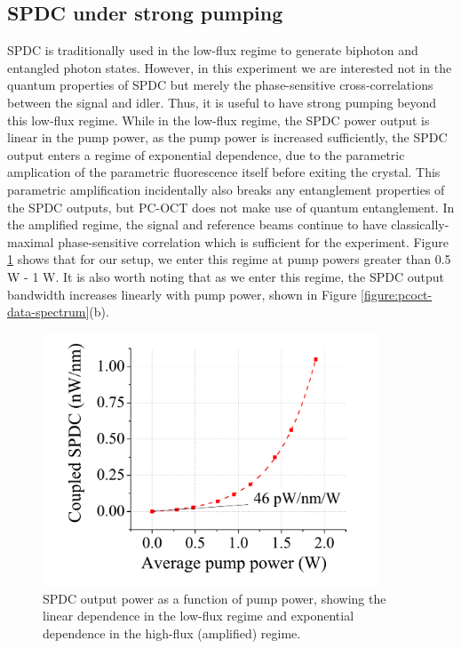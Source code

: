 \subsection{SPDC under strong pumping}

SPDC is traditionally used in the low-flux regime to generate biphoton and entangled photon states. However, in this experiment we are interested not in the quantum properties of SPDC but merely the phase-sensitive cross-correlations between the signal and idler. Thus, it is useful to have strong pumping beyond this low-flux regime. While in the low-flux regime, the SPDC power output is linear in the pump power, as the pump power is increased sufficiently, the SPDC output enters a regime of exponential dependence, due to the parametric amplication of the parametric fluorescence itself before exiting the crystal. This parametric amplification incidentally also breaks any entanglement properties of the SPDC outputs, but  PC-OCT does not make use of quantum entanglement. In the amplified regime, the signal and reference beams continue to have classically-maximal phase-sensitive correlation which is sufficient for the experiment. Figure \ref{figure:pcoct-data-power} shows that for our setup, we enter this regime at pump powers greater than 0.5 W - 1 W. It is also worth noting that as we enter this regime, the SPDC output bandwidth increases linearly with pump power, shown in Figure \ref{figure:pcoct-data-spectrum}(b).


\begin{figure}[t]
\begin{center}
\includegraphics[width=10cm]{figure-pcoct-data-power.pdf}
\caption{SPDC output power as a function of pump power, showing the linear dependence in the low-flux regime and exponential dependence in the high-flux (amplified) regime.}
\label{figure:pcoct-data-power}
\end{center}
\end{figure}

